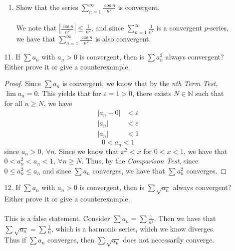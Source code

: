 \documentclass[12pt,letterpaper]{article}
\newcommand{\abs}[1]{\left\lvert #1 \right\rvert}
\newcommand{\N}{\mathbb{N}}
\theoremstyle{case}
\theoremstyle{definition}
\begin{document}
\begin{enumerate}
\begin{enumerate}
\begin{enumerate}
				\item Show that the series $\displaystyle\sum_{n=1}^{\infty} \frac{\cos n}{n^2}$ is convergent.
				\\\\We note that $\abs{\frac{\cos n}{n^2}} \leq \frac{1}{n^2}$, and since $\displaystyle\sum_{n=1}^{\infty}\frac{1}{n^2}$ is a convergent $p$-series, we have that $\displaystyle\sum_{n=1}^{\infty} \frac{\cos n}{n^2}$ is also convergent.
			\end{enumerate}
			\item[11.] If $\sum a_n$ with $a_n>0$ is convergent, then is $\sum a^2_n$ always convergent? Either prove it or give a counterexample.
			\begin{proof}
				Since $\sum a_n$ is convergent, we know that by the \textit{nth Term Test}, $\lim a_n=0$. This yields that for $\varepsilon=1>0$, there exists $N \in \N$ such that for all $n \geq N$, we have
				\begin{align*}
					|a_n-0| &<\varepsilon \\
					|a_n|&<\varepsilon \\
					|a_n|&<1 
				\end{align*}
				\[0<a_n<1\]
				since $a_n > 0,\ \forall n$. Since we know that $x^2<x$ for $0 < x < 1$, we have that $0<a_n^2<a_n<1,\ \forall n \geq N$. Thus, by the \textit{Comparison Test}, since $0 \leq a_n^2 \leq a_n$ and since $\sum a_n$ converges, we have that $\sum a_n^2$ converges.
			\end{proof}
			
			\item[12.] If $\sum a_n$ with $a_n>0$ is convergent, then is $\sum \sqrt{a_n}$ always convergent? Either prove it or give a counterexample.
			\\\\This is a false statement. Consider $\sum a_n = \sum \frac{1}{n^2}$. Then we have that $\sum \sqrt{a_n} = \sum \frac{1}{n}$, which is a harmonic series, which we know diverges. Thus if $\sum a_n$ converges, then $\sum \sqrt{a_n}$ does not necessarily converge.\\
			

\end{enumerate}
\end{enumerate}
\end{document}
